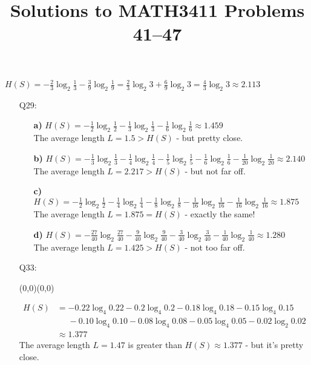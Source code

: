 \documentclass[11pt]{article}
\date{}
\author{}
\title{\sc Solutions to MATH3411 Problems 41--47}
\newcommand{\moveup}{\begin{picture}(0,0)(0,0)\end{picture}\vspace*{-8.15mm}}
\begin{document}
 \maketitle

\vspace*{-10mm}

$H(S) = -\frac{2}{3}\log_2\frac{1}{3}-\frac{3}{9}\log_2\frac{1}{9}
      =  \frac{2}{3}\log_2 3 + \frac{6}{9}\log_2 3
      =  \frac{4}{3}\log_2 3
      \approx 2.113$

\bigskip{}
\begin{itemize}
  \item[{Q29:}]
    \begin{itemize}
      \item[{\bf a)}] $H(S) = -\frac{1}{2}\log_2\frac{1}{2} -\frac{1}{3}\log_2\frac{1}{3} -\frac{1}{6}\log_2\frac{1}{6} \approx 1.459$
        \\The average length $L = 1.5 > H(S)$ - but pretty close.
      \item[{\bf b)}] $H(S) = -\frac{1}{3}\log_2\frac{1}{3} -\frac{1}{4}\log_2\frac{1}{4} -\frac{1}{5}\log_2\frac{1}{5} -\frac{1}{6}\log_2\frac{1}{6} -\frac{1}{20}\log_2\frac{1}{20} \approx 2.140$
        \\The average length $L = 2.217 > H(S)$ - but not far off.
      \item[{\bf c)}] $H(S) = -\frac{1}{2}\log_2\frac{1}{2} -\frac{1}{4}\log_2\frac{1}{4} -\frac{1}{8}\log_2\frac{1}{8} -\frac{1}{16}\log_2\frac{1}{16} -\frac{1}{16}\log_2\frac{1}{16} \approx 1.875$
        \\The average length $L = 1.875 = H(S)$ - exactly the same!
      \item[{\bf d)}] $H(S) = -\frac{27}{40}\log_2\frac{27}{40} -\frac{9}{40}\log_2\frac{9}{40} -\frac{3}{40}\log_2\frac{3}{40} -\frac{1}{40}\log_2\frac{1}{40} \approx 1.280$
        \\The average length $L = 1.425 > H(S)$ - not too far off.
    \end{itemize}
  \item[{Q33:}] \moveup
        \begin{align*} H(S) &=           - 0.22\log_4 0.22 - 0.2 \log_4 0.2  - 0.18\log_4 0.18 - 0.15\log_4 0.15\\
                            &\phantom{=} - 0.10\log_4 0.10 - 0.08\log_4 0.08 - 0.05\log_4 0.05 - 0.02\log_2 0.02\\
                            &\approx 1.377\end{align*}
        The average length $L =  1.47$ is greater than $H(S) \approx 1.377$ - but it's pretty close.

\end{itemize}
\end{document}
